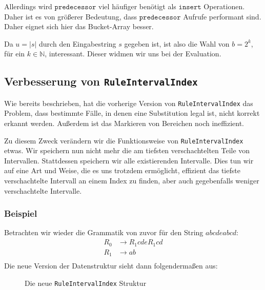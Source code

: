 Allerdings wird $\texttt{predecessor}$ viel häufiger benötigt als $\texttt{insert}$ Operationen. Daher ist es von größerer Bedeutung, dass $\texttt{predecessor}$ Aufrufe performant sind. Daher eignet sich hier das Bucket-Array besser.

Da $u = |s|$ durch den Eingabestring $s$ gegeben ist, ist also die Wahl von $b = 2^k$, für ein $k \in \mathbb{N}$, interessant. Dieser widmen wir uns bei der Evaluation.

\subsection{Verbesserung von \texttt{RuleIntervalIndex}}

Wie bereits beschrieben, hat die vorherige Version von \texttt{RuleIntervalIndex} das Problem, dass bestimmte Fälle, in denen eine Substitution legal ist, nicht korrekt erkannt werden. Außerdem ist das Markieren von Bereichen noch ineffizient.  

Zu diesem Zweck verändern wir die Funktionsweise von \texttt{RuleIntervalIndex} etwas.
Wir speichern nun nicht mehr die am tiefsten verschachtelten Teile von Intervallen. Stattdessen speichern wir alle existierenden Intervalle. Dies tun wir auf eine Art und Weise, die es uns trotzdem ermöglicht, effizient das tiefste verschachtelte Intervall an einem Index zu finden, aber auch gegebenfalls weniger verschachtelte Intervalle. 

\subsubsection{Beispiel}

Betrachten wir wieder die Grammatik von zuvor für den String $abcdeabcd$:
\begin{align*}
	R_0 &\rightarrow R_1 c d e R_1 c d\\
	R_1 &\rightarrow a b\\
\end{align*}
Die neue Version der Datenstruktur sieht dann folgendermaßen aus:

\begin{figure}[H]
    \centering
    \caption{Die neue \texttt{RuleIntervalIndex} Struktur}
    \label{newrii}
\end{figure}


